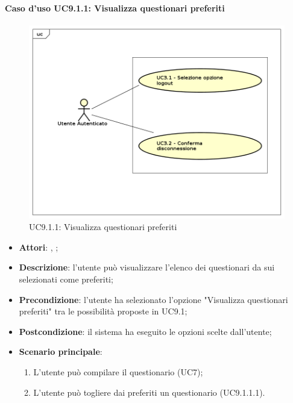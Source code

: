		\paragraph{Caso d'uso UC9.1.1: Visualizza questionari preferiti}
		\label{UC9.1.1}
		\begin{figure}[h]
			\centering
		\includegraphics[scale=0.7,keepaspectratio]{UML/UC9.png}
			\caption{UC9.1.1: Visualizza questionari preferiti}
		\end{figure}
		\FloatBarrier
		\begin{itemize}
			\item \textbf{Attori}: \uau, \uaupro;
			\item \textbf{Descrizione}: l'utente può visualizzare l'elenco dei questionari da sui selezionati come preferiti;
			\item \textbf{Precondizione}: l'utente ha selezionato l'opzione "Visualizza questionari preferiti" tra le possibilità proposte in UC9.1;
			\item \textbf{Postcondizione}: il sistema ha eseguito le opzioni scelte dall'utente;
			\item \textbf{Scenario principale}: 
				\begin{enumerate}
					\item L'utente può compilare il questionario (UC7);
					\item L'utente può togliere dai preferiti un questionario (UC9.1.1.1).
				\end{enumerate}
		\end{itemize}
		
